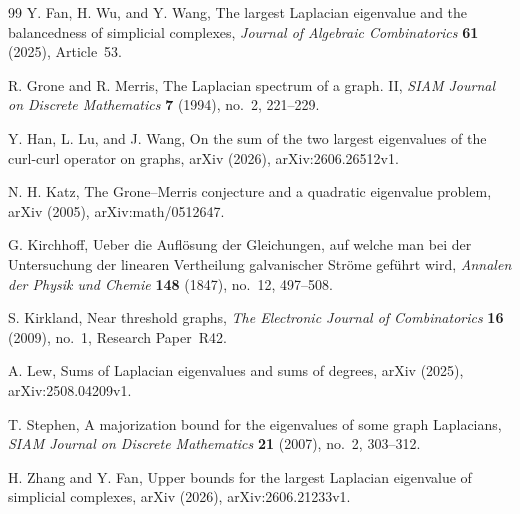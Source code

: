 \documentclass[11pt]{article}
\begin{document}
\begin{thebibliography}{99}
	Y. Fan, H.  Wu, and Y. Wang,
	\newblock The largest Laplacian eigenvalue and the balancedness of
	simplicial complexes,
	\newblock \emph{Journal of Algebraic Combinatorics} \textbf{61}
	(2025), Article~53.
	

	R. Grone and R. Merris,
	\newblock The Laplacian spectrum of a graph. II,
	\newblock \emph{SIAM Journal on Discrete Mathematics} \textbf{7}
	(1994), no.~2, 221--229.
	

	Y. Han, L. Lu, and J. Wang,
	\newblock On the sum of the two largest eigenvalues of the curl-curl
	operator on graphs,
	arXiv (2026),
arXiv:2606.26512v1.

	N. H. Katz,
	\newblock The Grone--Merris conjecture and a quadratic eigenvalue
	problem,
	arXiv (2005),
arXiv:math/0512647.

	G. Kirchhoff,
	\newblock Ueber die Aufl\"osung der Gleichungen, auf welche man bei der
	Untersuchung der linearen Vertheilung galvanischer Str\"ome gef\"uhrt
	wird,
	\newblock \emph{Annalen der Physik und Chemie} \textbf{148} (1847),
	no.~12, 497--508.

	S. Kirkland,
	\newblock Near threshold graphs,
	\newblock \emph{The Electronic Journal of Combinatorics} \textbf{16}
	(2009), no.~1, Research Paper~R42.

	A. Lew,
	\newblock Sums of Laplacian eigenvalues and sums of degrees,
 arXiv (2025),
arXiv:2508.04209v1.

	T. Stephen,
	\newblock A majorization bound for the eigenvalues of some graph
	Laplacians,
	\newblock \emph{SIAM Journal on Discrete Mathematics} \textbf{21}
	(2007), no.~2, 303--312.
	

	H. Zhang and Y.  Fan,
	\newblock Upper bounds for the largest Laplacian eigenvalue of simplicial
	complexes, arXiv  (2026),
arXiv:2606.21233v1.

\end{thebibliography}


	
\end{document}
